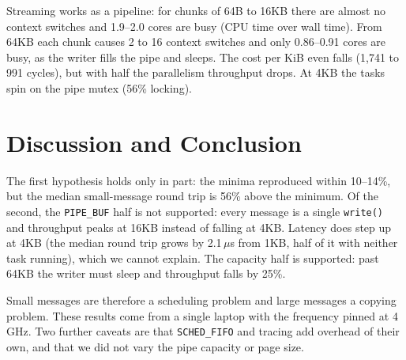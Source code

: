 \documentclass[11pt,sigconf,nonacm]{acmart}
\begin{document}
Streaming works as a pipeline: for chunks of 64B to 16KB there are almost no context switches and 1.9--2.0 cores are busy (CPU time over wall time). From 64KB each chunk causes 2 to 16 context switches and only 0.86--0.91 cores are busy, as the writer fills the pipe and sleeps. The cost per KiB even falls (1,741 to 991 cycles), but with half the parallelism throughput drops. At 4KB the tasks spin on the pipe mutex (56\% locking).

\section{Discussion and Conclusion}

The first hypothesis holds only in part: the minima reproduced within 10--14\%, but the median small-message round trip is 56\% above the minimum. Of the second, the \texttt{PIPE\_BUF} half is not supported: every message is a single \texttt{write()} and throughput peaks at 16KB instead of falling at 4KB. Latency does step up at 4KB (the median round trip grows by 2.1\,$\mu$s from 1KB, half of it with neither task running), which we cannot explain. The capacity half is supported: past 64KB the writer must sleep and throughput falls by 25\%.

Small messages are therefore a scheduling problem and large messages a copying problem. These results come from a single laptop with the frequency pinned at 4\,GHz. Two further caveats are that \texttt{SCHED\_FIFO} and tracing add overhead of their own, and that we did not vary the pipe capacity or page size.

\clearpage


\end{document}
